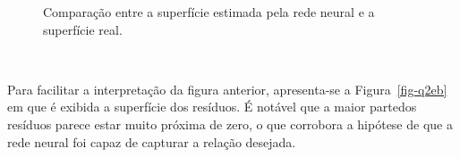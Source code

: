 \documentclass[
  a4paperpaper,
]{article}
\begin{document}
\begin{figure}[H]


\caption{\label{fig-q2e}Comparação entre a superfície estimada pela rede
neural e a superfície real.}

\end{figure}%

~

Para facilitar a interpretação da figura anterior, apresenta-se a
Figura~\ref{fig-q2eb} em que é exibida a superfície dos resíduos. É
notável que a maior partedos resíduos parece estar muito próxima de
zero, o que corrobora a hipótese de que a rede neural foi capaz de
capturar a relação desejada.

~
\end{document}
